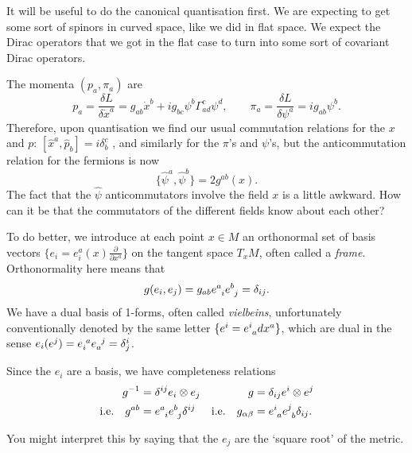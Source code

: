 It will be useful to do the canonical quantisation first. We are expecting to get some sort of spinors in curved space, like we did in flat space.
We expect the Dirac operators that we got in the flat case to turn into some sort of covariant Dirac operators.

The momenta $(p_a, \pi_a)$  are
\begin{equation}
  p_a = \frac{\delta L}{\delta \dot{x}^a} = g_{ab} \dot{x}^b + i g_{bc} \psi^{b} \Gamma^{c}_{ad} \psi^{d}, \qquad
  \pi_a = \frac{\delta L}{\delta \psi^a} = i g_{ab} \psi^{b}.
\end{equation}
Therefore, upon quantisation we find our usual commutation relations for the $x$  and $p$:  $[\hat{x}^a, \hat{p}_b] = i \delta^{c}_b$ , and similarly for the $\pi$'s and $\psi$'s, but the anticommutation relation for the fermions is now
\begin{equation}
  \{\hat{\psi}^a, \hat{\psi}^b\} = 2 g^{ab}(x).
\end{equation}
The fact that the $\hat{\psi}$  anticommutators involve the field $x$ is a little awkward. How can it be that the commutators of the different fields know about each other?

To do better, we introduce at each point  $x \in M$  an orthonormal set of basis vectors $\{e_i = e_i^a(x) \frac{\partial }{\partial x^{a}}\}$ on the tangent space $T_x M$, often called a \emph{frame}.
Orthonormality here means that 
\begin{equation}
  g(e_i, e_j) = g_{ab} e\indices{^{a}_{i}} e\indices{^{b}_{j}} = \delta_{ij}.
\end{equation}
We have a dual basis of 1-forms, often called \emph{vielbeins}, unfortunately conventionally denoted by the same letter $\{e^i = e\indices{^{i}_{a}} dx^{a}\}$, which are dual in the sense $e_{i} (e^{j}) = e\indices{_{i}^{a}} e\indices{_{a}^{j}} = \delta^{i}_{j}$.

Since the $e_i$ are a basis, we have completeness relations
\begin{align}
  g^{-1} &= \delta^{ij} e_{i} \otimes e_{j} & g &= \delta_{ij} e^{i} \otimes e^{j} \\
  \text{i.e.} \quad g^{ab} &= e\indices{^{a}_{i}} e\indices{^{b}_{j}} \delta^{ij} & \text{i.e.} \quad g_{\alpha\beta} &= e\indices{^{i}_{a}} e\indices{^{j}_{b}} \delta_{ij}.
\end{align}
\begin{remark}
  You might interpret this by saying that the $e_j$ are the `square root' of the metric.
\end{remark}

